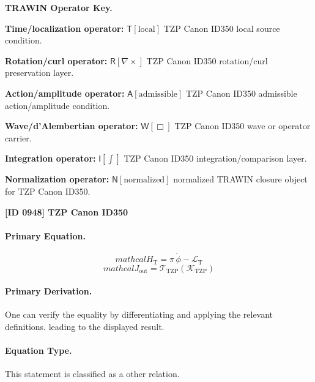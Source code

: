 \par\vspace{0.45\baselineskip}
\noindent\begin{minipage}[t]{\linewidth}
\begingroup
\small
\raggedright
\textbf{TRAWIN Operator Key.}\par
\noindent\textbf{Time/localization operator:} $\mathsf{T}\!\left[\mathrm{local}\right]$ TZP Canon ID350 local source condition.\par
\noindent\textbf{Rotation/curl operator:} $\mathsf{R}\!\left[\nabla\times\right]$ TZP Canon ID350 rotation/curl preservation layer.\par
\noindent\textbf{Action/amplitude operator:} $\mathsf{A}\!\left[\mathrm{admissible}\right]$ TZP Canon ID350 admissible action/amplitude condition.\par
\noindent\textbf{Wave/d'Alembertian operator:} $\mathsf{W}\!\left[\Box\right]$ TZP Canon ID350 wave or operator carrier.\par
\noindent\textbf{Integration operator:} $\mathsf{I}\!\left[\int\right]$ TZP Canon ID350 integration/comparison layer.\par
\noindent\textbf{Normalization operator:} $\mathsf{N}\!\left[\mathrm{normalized}\right]$ normalized TRAWIN closure object for TZP Canon ID350.\par
\endgroup
\end{minipage}

\clearpage
\noindent\textbf{[ID 0948] TZP Canon ID350}\par
\vspace{0.35em}
\paragraph{Primary Equation.}
\[
mathcal{H}_{\mathrm{T}}=\pi\,\dot{\phi}-\mathcal{L}_{\mathrm{T}}
\]
\[
mathcal{J}_{\mathrm{out}} = \mathcal{T}_{\mathrm{TZP}}\!\left(\mathcal{K}_{\mathrm{TZP}}\right)
\]

\paragraph{Primary Derivation.}
One can verify the equality by differentiating and applying the relevant definitions. leading to the displayed result.
\paragraph{Equation Type.}
This statement is classified as a other relation.

